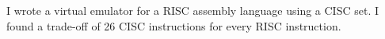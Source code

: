 \documentclass[]{deedy-resume-openfont}
\begin{document}
\begin{minipage}[t]{0.66\textwidth}
\begin{tightemize}
\item I wrote a virtual emulator for a RISC assembly language using a CISC set. I found a trade-off of 26 CISC instructions for every RISC instruction.
\end{tightemize}


\end{minipage} 
\end{document}
